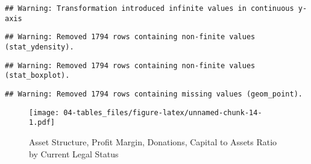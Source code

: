\documentclass[a4paper,nobind]{templates/ociamthesis}
\begin{document}
\begin{landscape}
\begin{verbatim}
## Warning: Transformation introduced infinite values in continuous y-axis
\end{verbatim}

\begin{verbatim}
## Warning: Removed 1794 rows containing non-finite values (stat_ydensity).
\end{verbatim}

\begin{verbatim}
## Warning: Removed 1794 rows containing non-finite values (stat_boxplot).
\end{verbatim}

\begin{verbatim}
## Warning: Removed 1794 rows containing missing values (geom_point).
\end{verbatim}

\begin{figure}
\centering
\texttt{[image: 04-tables\_files/figure-latex/unnamed-chunk-14-1.pdf]}
\caption{\label{fig:unnamed-chunk-14}Asset Structure, Profit Margin, Donations, Capital to Assets Ratio by Current Legal Status}
\end{figure}

\end{landscape}
\end{document}
